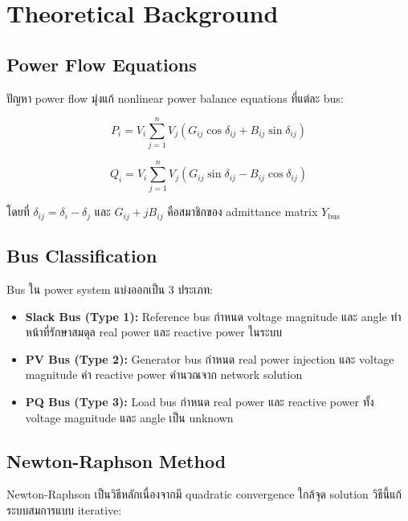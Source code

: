 \documentclass[12pt,a4paper]{article}
\begin{document}
\section{Theoretical Background}

\subsection{Power Flow Equations}

ปัญหา power flow มุ่งแก้ nonlinear power balance equations ที่แต่ละ bus:

\begin{equation}
P_i = V_i \sum_{j=1}^{n} V_j \left( G_{ij} \cos \delta_{ij} + B_{ij} \sin \delta_{ij} \right)
\end{equation}

\begin{equation}
Q_i = V_i \sum_{j=1}^{n} V_j \left( G_{ij} \sin \delta_{ij} - B_{ij} \cos \delta_{ij} \right)
\end{equation}

โดยที่ $\delta_{ij} = \delta_i - \delta_j$ และ $G_{ij} + jB_{ij}$ คือสมาชิกของ admittance matrix $Y_{\text{bus}}$

\subsection{Bus Classification}

Bus ใน power system แบ่งออกเป็น 3 ประเภท:

\begin{itemize}
    \item \textbf{Slack Bus (Type 1):} Reference bus กำหนด voltage magnitude และ angle ทำหน้าที่รักษาสมดุล real power และ reactive power ในระบบ
    \item \textbf{PV Bus (Type 2):} Generator bus กำหนด real power injection และ voltage magnitude ค่า reactive power คำนวณจาก network solution
    \item \textbf{PQ Bus (Type 3):} Load bus กำหนด real power และ reactive power ทั้ง voltage magnitude และ angle เป็น unknown
\end{itemize}

\subsection{Newton-Raphson Method}

Newton-Raphson เป็นวิธีหลักเนื่องจากมี quadratic convergence ใกล้จุด solution วิธีนี้แก้ระบบสมการแบบ iterative:
\end{document}

